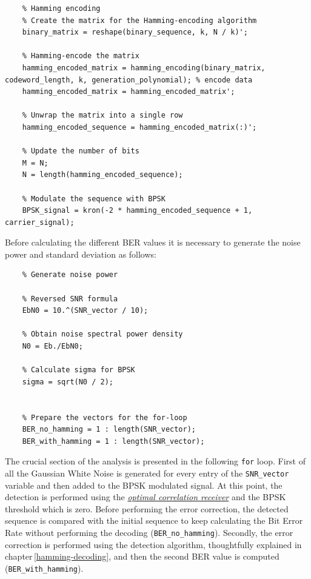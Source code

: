 \begin{lstlisting}
    % Hamming encoding
    % Create the matrix for the Hamming-encoding algorithm
    binary_matrix = reshape(binary_sequence, k, N / k)';

    % Hamming-encode the matrix
    hamming_encoded_matrix = hamming_encoding(binary_matrix, codeword_length, k, generation_polynomial); % encode data
    hamming_encoded_matrix = hamming_encoded_matrix';

    % Unwrap the matrix into a single row
    hamming_encoded_sequence = hamming_encoded_matrix(:)';

    % Update the number of bits
    M = N;
    N = length(hamming_encoded_sequence);

    % Modulate the sequence with BPSK
    BPSK_signal = kron(-2 * hamming_encoded_sequence + 1, carrier_signal);
\end{lstlisting}

\noindent Before calculating the different BER values it is necessary to generate the noise power and standard deviation as follows:

\begin{lstlisting}
    % Generate noise power

    % Reversed SNR formula
    EbN0 = 10.^(SNR_vector / 10);
    
    % Obtain noise spectral power density
    N0 = Eb./EbN0;
    
    % Calculate sigma for BPSK
    sigma = sqrt(N0 / 2);  
    
    
    % Prepare the vectors for the for-loop
    BER_no_hamming = 1 : length(SNR_vector);
    BER_with_hamming = 1 : length(SNR_vector);
\end{lstlisting}

\noindent The crucial section of the analysis is presented in the following \texttt{for} loop. First of all the Gaussian White Noise is generated for every entry of the \texttt{SNR\_vector} variable and then added to the BPSK modulated signal. At this point, the detection is performed using the \href{https://github.com/imAlessas/telecom-lab-works/blob/main/reports/lab-4/Trigolo_Report_Lab4.pdf}{\textsl{optimal correlation receiver}} and the BPSK threshold which is zero. Before performing the error correction, the detected sequence is compared with the initial sequence to keep calculating the Bit Error Rate without performing the decoding (\texttt{BER\_no\_hamming}). Secondly, the error correction is performed using the detection algorithm, thoughtfully explained in chapter\,\ref{hamming-decoding}, and then the second BER value is computed (\texttt{BER\_with\_hamming}).

